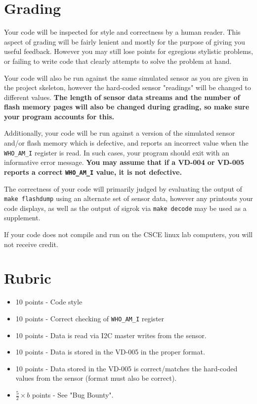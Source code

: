 \documentclass{article}
\begin{document}
\section{Grading}

Your code will be inspected for style and correctness by a human reader. This
aspect of grading will be fairly lenient and mostly for the purpose of giving
you useful feedback. However you may still lose points for egregious stylistic
problems, or failing to write code that clearly attempts to solve the problem
at hand.

Your code will also be run against the same simulated sensor as you are given
in the project skeleton, however the hard-coded sensor "readings" will be
changed to different values. \textbf{The length of sensor data streams and the
number of flash memory pages will also be changed during grading, so make sure
your program accounts for this.}

Additionally, your code will be run against a version of the simulated sensor
and/or flash memory which is defective, and reports an incorrect value when the
\texttt{WHO\_AM\_I} register is read. In such cases, your program should exit
with an informative error message. \textbf{You may assume that if a VD-004 or
VD-005 reports a correct \texttt{WHO\_AM\_I} value, it is not defective.}

The correctness of your code will primarily judged by evaluating the output of
\texttt{make flashdump} using an alternate set of sensor data, however any
printouts your code displays, as well as the output of sigrok via \texttt{make
decode} may be used as a supplement.

If your code does not compile and run on the CSCE linux lab computers, you will
not receive credit.

\section{Rubric}

\begin{itemize}

	\item 10 points - Code style

	\item 10 points - Correct checking of \texttt{WHO\_AM\_I} register

	\item 10 points - Data is read via I2C master writes from the sensor.

	\item 10 points - Data is stored in the VD-005 in the proper format.

	\item 10 points - Data stored in the VD-005 is correct/matches the
		hard-coded values from the sensor (format must also be
		correct).

	\item $\frac{5}{2} \times b$ points - See "Bug Bounty".

\end{itemize}
\end{document}
